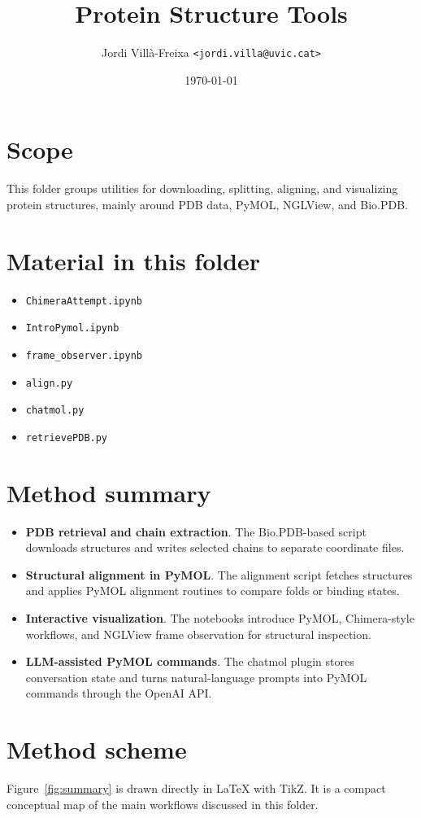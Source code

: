 \documentclass[11pt,a4paper]{article}
\title{Protein Structure Tools}
\author{Jordi Vill\`a-Freixa \texttt{<jordi.villa@uvic.cat>}}
\date{\today}
\begin{document}
    \maketitle

    \section*{Scope}
    This folder groups utilities for downloading, splitting, aligning, and visualizing protein structures, mainly around PDB data, PyMOL, NGLView, and Bio.PDB.

    \section*{Material in this folder}
    \begin{itemize}[leftmargin=*]
\item \texttt{ChimeraAttempt.ipynb}
\item \texttt{IntroPymol.ipynb}
\item \texttt{frame\_observer.ipynb}
\item \texttt{align.py}
\item \texttt{chatmol.py}
\item \texttt{retrievePDB.py}
    \end{itemize}

    \section*{Method summary}
    \begin{itemize}[leftmargin=*]
\item \textbf{PDB retrieval and chain extraction}. The Bio.PDB-based script downloads structures and writes selected chains to separate coordinate files.
\item \textbf{Structural alignment in PyMOL}. The alignment script fetches structures and applies PyMOL alignment routines to compare folds or binding states.
\item \textbf{Interactive visualization}. The notebooks introduce PyMOL, Chimera-style workflows, and NGLView frame observation for structural inspection.
\item \textbf{LLM-assisted PyMOL commands}. The chatmol plugin stores conversation state and turns natural-language prompts into PyMOL commands through the OpenAI API.
    \end{itemize}

    \section*{Method scheme}
    Figure~\ref{fig:summary} is drawn directly in LaTeX with TikZ. It is a compact conceptual map of the main workflows discussed in this folder.
\end{document}
